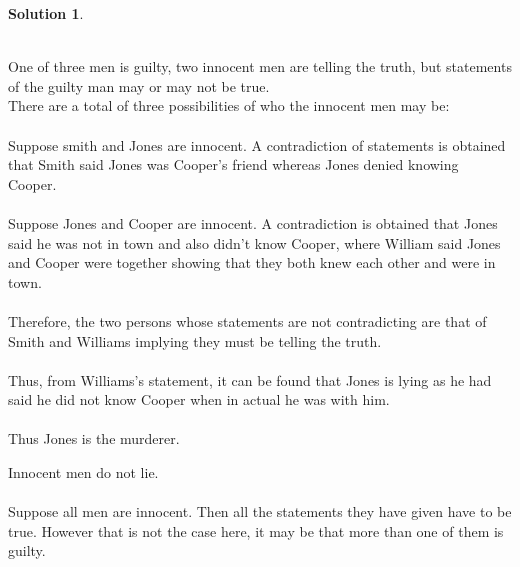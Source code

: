 \documentclass{article}
\theoremstyle{definition}
\newtheorem*{solution}{Solution}
\begin{document}
\begin{solution}\ \\
\ \\
\begin{compactenum}
\renewcommand{\theenumi}{\alph{enumi}} 
\item
One of three men is guilty, two innocent men are telling the truth, but statements of the guilty man may or may not be true.\ \\
There are a total of three possibilities of who the innocent men may be:\ \\
\ \\
Suppose smith and Jones are innocent. A contradiction of statements is obtained that Smith said Jones was Cooper’s friend whereas Jones denied knowing Cooper.\ \\
\ \\
Suppose Jones and Cooper are innocent. A contradiction is obtained that Jones said he was not in town and also didn't know Cooper, where William said Jones and Cooper were together showing that they both knew each other and were in town.\ \\
\ \\
Therefore, the two persons whose statements are not contradicting are that of Smith and Williams implying they must be telling the truth.\ \\
\ \\
Thus, from Williams’s statement, it can be found that Jones is lying as he had said he did not know Cooper when in actual he was with him.\ \\
\ \\
Thus Jones is the murderer.
\ \\
\item Innocent men do not lie.\ \\
\ \\
Suppose all men are innocent. Then all the statements they have given have to be true. However that is not the case here, it may be that more than one of them is guilty.\ \\
\ \\

\end{compactenum}
\end{solution}
\end{document}
